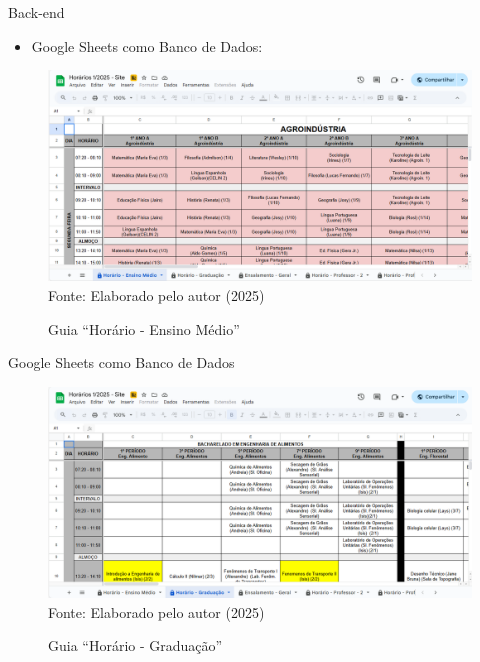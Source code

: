 \begin{frame}{Back-end}
    \begin{itemize}
        \item Google Sheets como Banco de Dados: \vspace{0.5cm}
    \end{itemize}
    \begin{figure}
        \centering
        \vspace{-0.8cm}
        \caption{Guia ``Horário - Ensino Médio''}
        \vspace{-0.2cm}
        \includegraphics[width=1\textwidth]{figuras/plan-1.png}
        \\ %
        \footnotesize Fonte: Elaborado pelo autor (2025)
    \end{figure}
\end{frame}

\begin{frame}{Google Sheets como Banco de Dados}
    \begin{figure}
        \centering
        \vspace{-0.5cm}
        \caption{Guia ``Horário - Graduação''}
        \vspace{-0.2cm}
        \includegraphics[width=1\textwidth]{figuras/plan-2.png}
        \\ %
        \footnotesize Fonte: Elaborado pelo autor (2025)
    \end{figure}
\end{frame}

